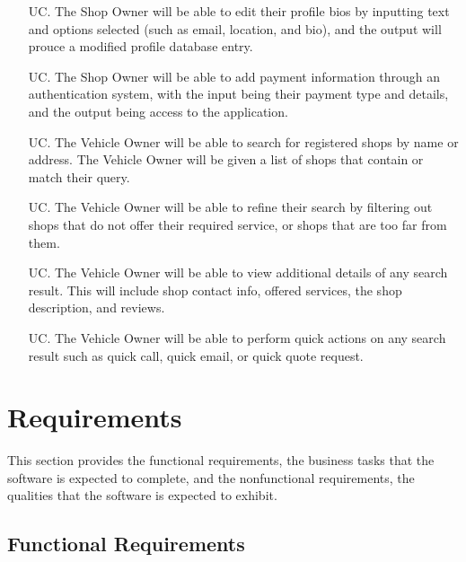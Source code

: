 \documentclass[12pt]{article}
\newcounter{usecasenum} %
\begin{document}
\begin{itemize}
      \item[UC\refstepcounter{usecasenum}\theusecasenum \label{R_Output}.] The Shop Owner will be able to edit their profile bios by inputting text and options selected (such as email, location, and bio), and the output will prouce a modified profile database entry.
    
      \item[UC\refstepcounter{usecasenum}\theusecasenum \label{R_Output}.] The Shop Owner will be able to add payment information through an authentication system, with the input being their payment type and details, and the output being access to the application.

      \item[UC\refstepcounter{usecasenum}\theusecasenum \label{R_Output}.] The Vehicle Owner will be able to search for registered shops by name or address. The Vehicle Owner will be given a list of shops that contain or match their query.
      
      \item[UC\refstepcounter{usecasenum}\theusecasenum \label{R_Output}.] The Vehicle Owner will be able to refine their search by filtering out shops that do not offer their required service, or shops that are too far from them.

      \item[UC\refstepcounter{usecasenum}\theusecasenum \label{R_Output}.] The Vehicle Owner will be able to view additional details of any search result. This will include shop contact info, offered services, the shop description, and reviews.

      \item[UC\refstepcounter{usecasenum}\theusecasenum \label{R_Output}.] The Vehicle Owner will be able to perform quick actions on any search result such as quick call, quick email, or quick quote request.

\end{itemize}

\section{Requirements}

This section provides the functional requirements, the business tasks that the
software is expected to complete, and the nonfunctional requirements, the
qualities that the software is expected to exhibit.

\subsection{Functional Requirements}
\end{document}

